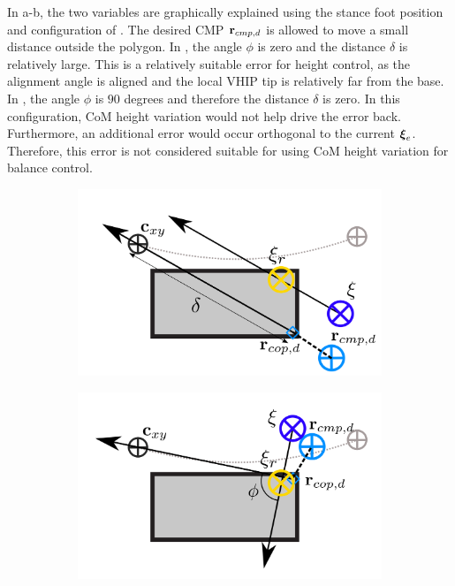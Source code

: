 In a-b, the two variables are graphically explained using the stance foot position and configuration of . The desired \ac{CMP} $\mathbf{r}_{cmp,d}$ is allowed to move a small distance outside the polygon. In , the angle $\phi$ is zero and the distance $\delta$ is relatively large. This is a relatively suitable error for height control, as the alignment angle is aligned and the local \ac{VHIP} tip is relatively far from the base. In , the angle $\phi$ is $90$ degrees and therefore the distance $\delta$ is zero. In this configuration, \ac{CoM} height variation would not help drive the error back. Furthermore, an additional error would occur orthogonal to the current $\boldsymbol{\xi}_e$. Therefore, this error is not considered suitable for using \ac{CoM} height variation for balance control.
\begin{figure}[h]
\centering
  \begin{subfigure}{0.49\textwidth}
    \centering
  \includegraphics[width=.7\linewidth]{STYLESTUFF/ICPplanStartSSPhiViz0.png}
    \caption{}
     \label{fig:phiVizc}
  \end{subfigure}
  \begin{subfigure}{0.49\textwidth}
    \centering
  \includegraphics[width=.7\linewidth]{STYLESTUFF/ICPplanStartSSPhiViz90.png}
    \caption{}
     \label{fig:phiVizd}
  \end{subfigure}
  \begin{subfigure}{0.49\textwidth}

\end{subfigure}
\end{figure}
